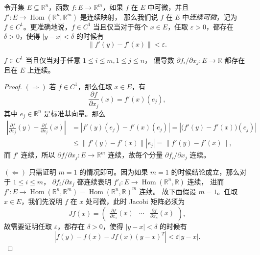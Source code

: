 \documentclass[fontset=none,zihao=-4]{Notes}
\DeclareMathOperator\Hom{Hom}
\newcommand{\norm}[1]{\left\lVert#1\right\rVert}
\newcommand{\abs}[1]{\left\lvert#1\right\rvert}
\begin{document}
令开集 $E\subseteq\mathbb{R}^n$，函数 $f:E\to\mathbb{R}^m$，如果
$f$ 在 $E$ 中可微，并且 $f':E\to\Hom(\mathbb{R}^n,\mathbb{R}^m)$ 是连续映射，
那么我们说 $f$ 在 $E$ 中\emph{连续可微}，记为 $f\in C^1$。更准确地说，$f\in C^1$ 
当且仅当对于每个 $x\in E$，任取 $\varepsilon>0$，都存在 $\delta>0$，使得 
$\abs{y-x}<\delta$ 的时候有
\[
  \norm{f'(y)-f'(x)}<\varepsilon.  
\]

\begin{theorem}
  $f\in C^1$ 当且仅当对于任意 $1\leq i\leq m,1\leq j\leq n$，
  偏导数 $\partial f_i/\partial x_j:E\to\mathbb{R}$ 都存在且在
  $E$ 上连续。
\end{theorem}
\begin{proof}
  $(\Rightarrow)$ 若 $f\in C^1$，那么任取 $x\in E$，有
  \[
    \frac{\partial f}{\partial x_j}(x)=f'(x)(e_j), 
  \]
  其中 $e_j\in\mathbb{R}^n$ 是标准基向量。那么
  \begin{align*}
    \abs{\frac{\partial f}{\partial x_j}(y)-\frac{\partial f}{\partial x_j}(x)}
    &=\abs{f'(y)(e_j)-f'(x)(e_j)}=\abs{\bigl(f'(y)-f'(x)\bigr)(e_j)}\\
    &\leq \norm{f'(y)-f'(x)}\abs{e_j}=\norm{f'(y)-f'(x)},
  \end{align*}
  而 $f'$ 连续，所以 $\partial f/\partial x_j:E\to\mathbb{R}^m$ 连续，故每个分量 
  $\partial f_i/\partial x_j$ 连续。

  $(\Leftarrow)$ 只需证明 $m=1$ 的情况即可。因为如果 $m=1$ 的时候结论成立，那么对于 $1\leq i\leq m$，
  $\partial f_i/\partial x_j$ 都连续表明 $f'_i:E\to \Hom(\mathbb{R}^n,\mathbb{R})$ 连续，
  进而 $f':E\to\Hom(\mathbb{R}^n,\mathbb{R}^m)=\Hom(\mathbb{R}^n,\mathbb{R})^m$ 连续。
  故下面假设 $m=1$。任取 $x\in E$，我们先说明 $f$ 在 $x$ 处可微，此时 Jacobi 矩阵必须为
  \[
    Jf(x)=\begin{pmatrix}
      \frac{\partial f}{\partial x_1}(x) & \cdots & \frac{\partial f}{\partial x_n}(x)
    \end{pmatrix},
  \]
  故需要证明任取 $\varepsilon$，都存在 $\delta>0$，使得 $\abs{y-x}<\delta$ 的时候有
  \[
    \abs{f(y)-f(x)-Jf(x)(y-x)^T}<\varepsilon\abs{y-x}.  
  \]
  

\end{proof}
\end{document}
